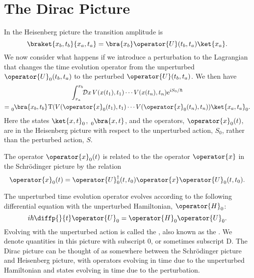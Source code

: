 \documentclass[fleqn]{NotesClass}
\newcommand*{\e}{\mathrm{e}}
\newcommand*{\hermit}{\dagger}
\newcommand*{\hamiltonian}{H}
\newcommand*{\timeorder}{\mathrm{T}}
\begin{document}
    \section{The Dirac Picture}
    In the Heisenberg picture the transition amplitude is
    \begin{equation}
        \braket{x_b, t_b}{x_a, t_a} = \bra{x_b} \operator{U}(t_b, t_a) \ket{x_a}.
    \end{equation}
    We now consider what happens if we introduce a perturbation to the Lagrangian that changes the time evolution operator from the unperturbed \(\operator{U}_0(t_b, t_a)\) to the perturbed \(\operator{U}(t_b, t_a)\).
    We then have
    \begin{multline}
        \int_{x_a}^{x_b} \!\! \DL{x} \, V(x(t_1), t_1) \dotsm V(x(t_n), t_n) \e^{iS_0/\hbar} \\
        = \tensor[_0]{\bra{x_b, t_b}}{} \timeorder(V(\operator{x}_0(t_1), t_1) \dotsm V(\operator{x}_0(t_n), t_n))\ket{x_a, t_a}_0.
    \end{multline}
    Here the states \(\ket{x, t}_0\), \(\tensor[_0]{\bra{x, t}}{}\), and the operators, \(\operator{x}_0(t)\), are in the Heisenberg picture with respect to the unperturbed action, \(S_0\), rather than the perturbed action, \(S\).
    
    The operator \(\operator{x}_0(t)\) is related to the the operator \(\operator{x}\) in the Schr\"odinger picture by the relation
    \begin{equation}
        \operator{x}_0(t) = \operator{U}_0^\hermit(t, t_0)\operator{x}\operator{U}_0(t, t_0).
    \end{equation}
    
    The unperturbed time evolution operator evolves according to the following differential equation with the unperturbed Hamiltonian, \(\operator{\hamiltonian}_0\):
    \begin{equation}
        i\hbar\diffp{}{t}\operator{U}_0 = \operator{\hamiltonian}_0\operator{U}_0.
    \end{equation}
    Evolving with the unperturbed action is called the , also known as the .
    We denote quantities in this picture with subscript \(0\), or sometimes subscript \(\mathrm{D}\).
    The Dirac picture can be thought of as somewhere between the Schr\"odinger picture and Heisenberg picture, with operators evolving in time due to the unperturbed Hamiltonian and states evolving in time due to the perturbation.
    
\end{document}

